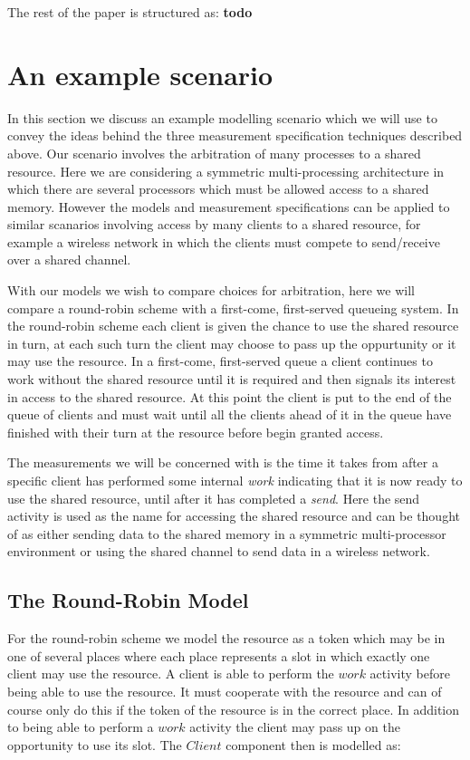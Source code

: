 \documentclass[times, 10pt,twocolumn]{article}
\newcommand{\adcComment}[1]{\textbf{#1}}
\newcommand{\quoteActivity}[1]{$#1$}
\newcommand{\quoteProcess}[1]{$#1$}
\begin{document}
The rest of the paper is structured as: \adcComment{todo}


\section{An example scenario}
In this section we discuss an example modelling scenario which
we will use to convey the ideas behind the three measurement
specification techniques described above.
Our scenario involves the arbitration of many processes to a shared
resource. Here we are considering a symmetric multi-processing 
architecture in which there are several processors which must be allowed
access to a shared memory. However the models and measurement specifications
can be applied to similar scanarios involving access by many clients to a
shared resource, for example a wireless network in which the clients must
compete to send/receive over a shared channel.

With our models we wish to compare choices for arbitration, here we will
compare a round-robin scheme with a first-come, first-served queueing system.
In the round-robin scheme each client is given the chance to use the shared
resource in turn, at each such turn the client may choose to pass up the
oppurtunity or it may use the resource. In a first-come, first-served queue
a client continues to work without the shared resource until it is required
and then signals its interest in access to the shared resource.
At this point the client is put to the end of the queue of clients
and must wait until all the clients ahead of it in the queue have
finished with their turn at the resource before begin granted access.

The measurements we will be concerned with is the time it takes from after
a specific client has performed some internal \emph{work} indicating that
it is now ready to use the shared resource, until after it has completed
a \emph{send}. Here the send activity is used as the name for accessing
the shared resource and can be thought of as either sending data to the
shared memory in a symmetric multi-processor environment or
using the shared channel to send data in a wireless network.

\subsection{The Round-Robin Model}

For the round-robin scheme we model the resource as a token
which may be in one of several places where each place represents
a slot in which exactly one client may use the resource.
A client is able to perform the \quoteActivity{work} activity
before being able to use the resource. It must cooperate with the
resource and can of course only do this if the token of the resource
is in the correct place. In addition to being able to perform a
\quoteActivity{work} activity the client may pass up on the opportunity
to use its slot.
The \quoteProcess{Client} component then is modelled as:
\end{document}

